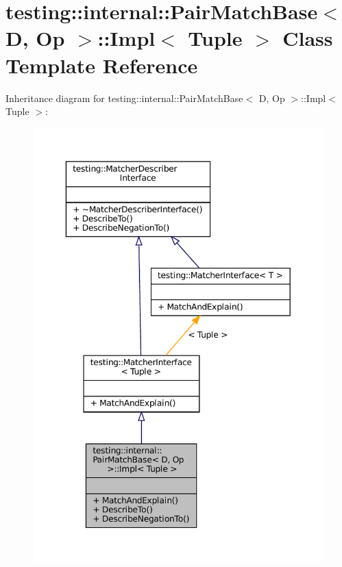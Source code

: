 \hypertarget{classtesting_1_1internal_1_1PairMatchBase_1_1Impl}{}\section{testing\+:\+:internal\+:\+:Pair\+Match\+Base$<$ D, Op $>$\+:\+:Impl$<$ Tuple $>$ Class Template Reference}
\label{classtesting_1_1internal_1_1PairMatchBase_1_1Impl}


Inheritance diagram for testing\+:\+:internal\+:\+:Pair\+Match\+Base$<$ D, Op $>$\+:\+:Impl$<$ Tuple $>$\+:
\nopagebreak
\begin{figure}[H]
\begin{center}
\leavevmode
\includegraphics[width=349pt]{classtesting_1_1internal_1_1PairMatchBase_1_1Impl__inherit__graph}
\end{center}
\end{figure}


